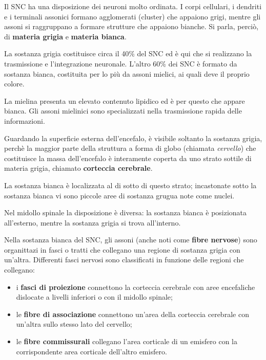 \documentclass[]{article}
\begin{document}
Il SNC ha una disposizione dei neuroni molto ordinata. I corpi
cellulari, i dendriti e i terminali assonici formano agglomerati
(cluster) che appaiono grigi, mentre gli assoni si raggruppano a formare
strutture che appaiono bianche. Si parla, perciò, di \textbf{materia
grigia} e \textbf{materia bianca}.

La sostanza grigia costituisce circa il 40\% del SNC ed è qui che si
realizzano la trasmissione e l'integrazione neuronale. L'altro 60\% dei
SNC è formato da sostanza bianca, costituita per lo più da assoni
mielici, ai quali deve il proprio colore.

La mielina presenta un elevato contenuto lipidico ed è per questo che
appare bianca. Gli assoni mielinici sono specializzati nella
trasmissione rapida delle informazioni.

Guardando la superficie esterna dell'encefalo, è visibile soltanto la
sostanza grigia, perchè la maggior parte della struttura a forma di
globo (chiamata \emph{cervello}) che costituisce la massa dell'encefalo
è interamente coperta da uno strato sottile di materia grigia, chiamato
\textbf{corteccia cerebrale}.

La sostanza bianca è localizzata al di sotto di questo strato;
incastonate sotto la sostanza bianca vi sono piccole aree di sostanza
grugua note come nuclei.

Nel midollo spinale la disposizione è diversa: la sostanza bianca è
posizionata all'esterno, mentre la sostanza grigia si trova all'interno.

Nella sostanza bianca del SNC, gli assoni (anche noti come \textbf{fibre
nervose}) sono organittazi in fasci o tratti che collegano una regione
di sostanza grigia con un'altra. Differenti fasci nervosi sono
classificati in funzione delle regioni che collegano:

\begin{itemize}
\itemsep1pt\parskip0pt
\item
  i \textbf{fasci di proiezione} connettono la corteccia cerebrale con
  aree encefaliche dislocate a livelli inferiori o con il midollo
  spinale;
\item
  le \textbf{fibre di associazione} connettono un'area della corteccia
  cerebrale con un'altra sullo stesso lato del cervello;
\item
  le \textbf{fibre commissurali} collegano l'area corticale di un
  emisfero con la corrispondente area corticale dell'altro emisfero.
\end{itemize}
\end{document}
